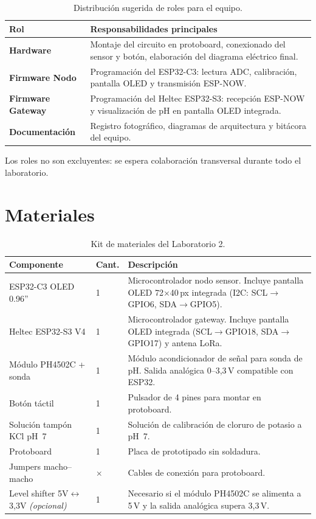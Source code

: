 \documentclass[12pt,leqno]{article}
\begin{document}
\begin{table}[!ht]
\centering
\begin{tabular}{|p{3.5cm}|p{9.5cm}|}
\hline
\textbf{Rol} & \textbf{Responsabilidades principales} \\
\hline
\textbf{Hardware} & Montaje del circuito en protoboard, conexionado del sensor y
bot\'on, elaboraci\'on del diagrama el\'ectrico final. \\
\hline
\textbf{Firmware Nodo} & Programaci\'on del ESP32-C3: lectura ADC, calibraci\'on,
pantalla OLED y transmisi\'on ESP-NOW. \\
\hline
\textbf{Firmware Gateway} & Programaci\'on del Heltec ESP32-S3: recepci\'on
ESP-NOW y visualizaci\'on de pH en pantalla OLED integrada. \\
\hline
\textbf{Documentaci\'on} & Registro fotogr\'afico, diagramas de arquitectura
y bit\'acora del equipo. \\
\hline
\end{tabular}
\caption{Distribuci\'on sugerida de roles para el equipo.}
\end{table}

\noindent Los roles no son excluyentes: se espera colaboraci\'on transversal durante
todo el laboratorio.

\newpage
\section{Materiales}

\begin{table}[h]
\centering
\begin{tabular}{|p{4.5cm}|p{1.2cm}|p{7.5cm}|}
\hline
\textbf{Componente} & \textbf{Cant.} & \textbf{Descripci\'on} \\
\hline
ESP32-C3 OLED 0.96'' & 1 & Microcontrolador nodo sensor. Incluye pantalla OLED
72$\times$40\,px integrada (I2C: SCL$\to$GPIO6, SDA$\to$GPIO5). \\
\hline
Heltec ESP32-S3 V4 & 1 & Microcontrolador gateway. Incluye pantalla OLED integrada
(SCL$\to$GPIO18, SDA$\to$GPIO17) y antena LoRa. \\
\hline
M\'odulo PH4502C + sonda & 1 & M\'odulo acondicionador de se\~nal para sonda de pH.
Salida anal\'ogica 0--3,3\,V compatible con ESP32. \\
\hline
Bot\'on t\'actil & 1 & Pulsador de 4 pines para montar en protoboard. \\
\hline
Soluci\'on tampón KCl pH~7 & 1 & Soluci\'on de calibraci\'on de cloruro de potasio
a pH~7. \\
\hline
Protoboard & 1 & Placa de prototipado sin soldadura. \\
\hline
Jumpers macho--macho & $\times$ & Cables de conexi\'on para protoboard. \\
\hline
Level shifter 5V$\leftrightarrow$3,3V \textit{(opcional)} & 1 & Necesario si el
m\'odulo PH4502C se alimenta a 5\,V y la salida anal\'ogica supera 3,3\,V. \\
\hline
\end{tabular}
\caption{Kit de materiales del Laboratorio 2.}
\end{table}
\end{document}
